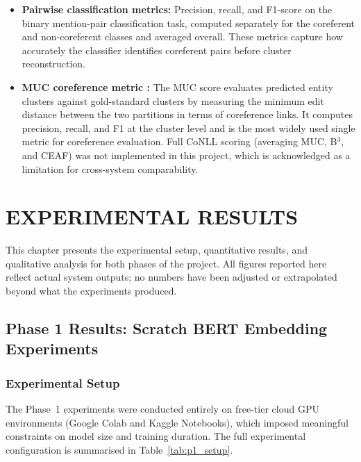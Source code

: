\documentclass[12pt,a4paper]{report}
\begin{document}
\begin{itemize}
    \item \textbf{Pairwise classification metrics:} Precision, recall, and F1-score on the binary mention-pair classification task, computed separately for the coreferent and non-coreferent classes and averaged overall. These metrics capture how accurately the classifier identifies coreferent pairs before cluster reconstruction.

    \item \textbf{MUC coreference metric \cite{vilain1995model}:} The MUC score evaluates predicted entity clusters against gold-standard clusters by measuring the minimum edit distance between the two partitions in terms of coreference links. It computes precision, recall, and F1 at the cluster level and is the most widely used single metric for coreference evaluation. Full CoNLL scoring (averaging MUC, B$^3$, and CEAF) was not implemented in this project, which is acknowledged as a limitation for cross-system comparability.
\end{itemize}


\chapter{EXPERIMENTAL RESULTS}

This chapter presents the experimental setup, quantitative results, and qualitative analysis for both phases of the project. All figures reported here reflect actual system outputs; no numbers have been adjusted or extrapolated beyond what the experiments produced.

\section{Phase 1 Results: Scratch BERT Embedding Experiments}

\subsection{Experimental Setup}

The Phase~1 experiments were conducted entirely on free-tier cloud GPU environments (Google Colab and Kaggle Notebooks), which imposed meaningful constraints on model size and training duration. The full experimental configuration is summarised in Table~\ref{tab:p1_setup}.
\end{document}

